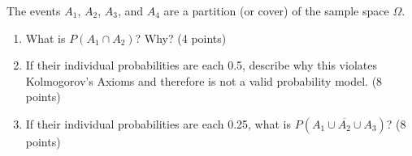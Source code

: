 
\item The events $A_1$, $A_2$, $A_3$, and $A_4$ are a partition (or cover) of the sample space $\Omega$.

\begin{enumerate}

\item What is $P(A_1 \cap A_2)$? Why? (4 points)

\vfill

\item If their individual probabilities are each 0.5, describe why this violates Kolmogorov's Axioms and therefore is not a valid probability model. (8 points)

\vfill \vfill

\item If their individual probabilities are each 0.25, what is $P(\overline{A_1 \cup A_2 \cup A_3})$? (8 points)

\ansfont{
\[ P(\overline{A_1 \cup A_2 \cup A_3}) = 1-P(A_1 \cup A_2 \cup A_3) = 1-P(A_1)-P(A_2)-P(A_3) = P(A_4) = 0.25 \] 
}
\vfill \vfill

\end{enumerate}
